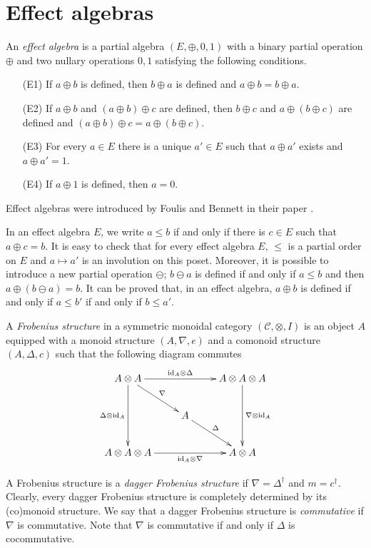 \documentclass{article}
\theoremstyle{definition}
\newcommand{\id}{\mathrm{id}}
\newcommand{\C}{\mathcal{C}}
\begin{document}
\section{Effect algebras}

An {\em effect algebra} 
is a partial algebra $(E,\oplus,0,1)$ with a binary 
partial operation $\oplus$ and two nullary operations $0,1$ satisfying
the following conditions.
\begin{enumerate}
\item[(E1)]If $a\oplus b$ is defined, then $b\oplus a$ is defined and
		$a\oplus b=b\oplus a$.
\item[(E2)]If $a\oplus b$ and $(a\oplus b)\oplus c$ are defined, then
		$b\oplus c$ and $a\oplus(b\oplus c)$ are defined and
		$(a\oplus b)\oplus c=a\oplus(b\oplus c)$.
\item[(E3)]For every $a\in E$ there is a unique $a'\in E$ such that
		$a\oplus a'$ exists and $a\oplus a'=1$.
\item[(E4)]If $a\oplus 1$ is defined, then $a=0$.
\end{enumerate}

Effect algebras were introduced by Foulis and Bennett in their paper 
\cite{FouBen:EAaUQL}.

In an effect algebra $E$, we write $a\leq b$ if and only if there is
$c\in E$ such that $a\oplus c=b$.  It is easy to check that for every effect
algebra $E$, $\leq$ is a partial order on $E$ and $a\mapsto a'$
is an involution on this poset.  Moreover, it is possible to introduce
a new partial operation $\ominus$; $b\ominus a$ is defined if and only if $a\leq
b$ and then $a\oplus(b\ominus a)=b$.  It can be proved that, in an effect
algebra, $a\oplus b$ is defined if and only if $a\leq b'$ if and only if $b\leq
a'$.

A {\em Frobenius structure} in a symmetric monoidal category $(\C,\otimes,I)$ is an object
$A$ equipped with a monoid structure $(A,\nabla,e)$ and a comonoid structure
$(A,\Delta,c)$ such that the following diagram commutes
\begin{equation}
\label{diag:frobenius}
\xymatrix{
A\otimes A
	\ar[rr]^-{\id_A\otimes\Delta}
	\ar[rd]^-{\nabla}
	\ar[dd]_-{\Delta\otimes\id_A}
&
~
&
A\otimes A\otimes A
	\ar[dd]^-{\nabla\otimes\id_A}
\\
~
&
A
	\ar[rd]^-{\Delta}
\\
A\otimes A\otimes A
	\ar[rr]_-{\id_A\otimes\nabla}
&
~
&
A\otimes A
}
\end{equation}

A Frobenius structure is a {\em dagger Frobenius structure} if
$\nabla=\Delta^\dag$ and $m=c^\dag$. Clearly, every dagger Frobenius structure
is completely determined by its (co)monoid structure.
We say that a dagger Frobenius structure is {\em commutative}
if $\nabla$ is commutative. Note that $\nabla$ is commutative if and only if
$\Delta$ is cocommutative.
\end{document}
